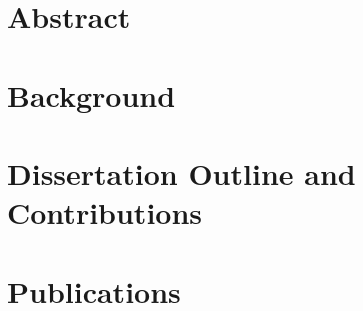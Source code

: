 \documentclass[a4paper, 12pt]{article}
\begin{document}


\section*{Abstract}


\section*{Background}


\section*{Dissertation Outline and Contributions}


\section*{Publications}


\nocite{*}
\begin{spacing}{0.9}


\end{spacing}
\end{document}
